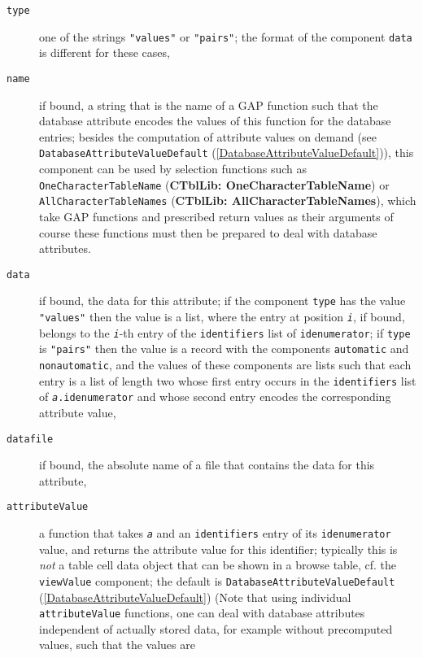 \documentclass[a4paper,11pt]{report}
\begin{document}
{{{ 
\begin{description}
\item[{\texttt{type}}]  one of the strings \texttt{"values"} or \texttt{"pairs"}; the format of the component \texttt{data} is different for these cases, 
\item[{\texttt{name}}]  if bound, a string that is the name of a \textsf{GAP} function such that the database attribute encodes the values of this function
for the database entries; besides the computation of attribute values on
demand (see \texttt{DatabaseAttributeValueDefault} (\ref{DatabaseAttributeValueDefault})), this component can be used by selection functions such as \texttt{OneCharacterTableName} (\textbf{CTblLib: OneCharacterTableName}) or \texttt{AllCharacterTableNames} (\textbf{CTblLib: AllCharacterTableNames}), which take \textsf{GAP} functions and prescribed return values as their arguments {\textendash}of
course these functions must then be prepared to deal with database attributes. 
\item[{\texttt{data}}]  if bound, the data for this attribute; if the component \texttt{type} has the value \texttt{"values"} then the value is a list, where the entry at position \mbox{\texttt{\mdseries\slshape i}}, if bound, belongs to the \mbox{\texttt{\mdseries\slshape i}}-th entry of the \texttt{identifiers} list of \texttt{idenumerator}; if \texttt{type} is \texttt{"pairs"} then the value is a record with the components \texttt{automatic} and \texttt{nonautomatic}, and the values of these components are lists such that each entry is a list
of length two whose first entry occurs in the \texttt{identifiers} list of \mbox{\texttt{\mdseries\slshape a}}\texttt{.idenumerator} and whose second entry encodes the corresponding attribute value, 
\item[{\texttt{datafile}}]  if bound, the absolute name of a file that contains the data for this
attribute, 
\item[{\texttt{attributeValue}}]  a function that takes \mbox{\texttt{\mdseries\slshape a}} and an \texttt{identifiers} entry of its \texttt{idenumerator} value, and returns the attribute value for this identifier; typically this is \emph{not} a table cell data object that can be shown in a browse table, cf. the \texttt{viewValue} component; the default is \texttt{DatabaseAttributeValueDefault} (\ref{DatabaseAttributeValueDefault}) (Note that using individual \texttt{attributeValue} functions, one can deal with database attributes independent of actually
stored data, for example without precomputed values, such that the values are

\end{description}}}}
\end{document}
